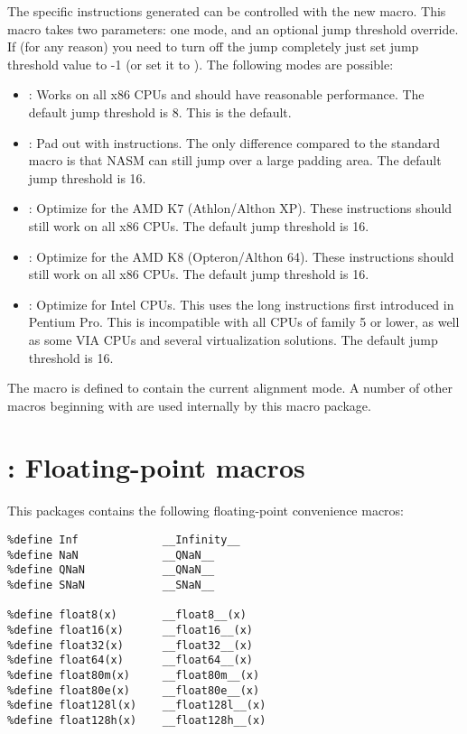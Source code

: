 The specific instructions generated can be controlled with the
new  macro. This macro takes two parameters: one mode,
and an optional jump threshold override. If (for any reason) you need
to turn off the jump completely just set jump threshold value to -1
(or set it to ). The following modes are possible:

\begin{itemize}
    \item{: Works on all x86 CPUs and should have
    reasonable performance. The default jump threshold is 8.
    This is the default.}

    \item{: Pad out with  instructions. The only
    difference compared to the standard  macro is that NASM
    can still jump over a large padding area. The default jump
    threshold is 16.}

    \item{: Optimize for the AMD K7 (Athlon/Althon XP).
    These instructions should still work on all x86 CPUs. The default
    jump threshold is 16.}

    \item{: Optimize for the AMD K8 (Opteron/Althon 64).
    These instructions should still work on all x86 CPUs. The default
    jump threshold is 16.}

    \item{: Optimize for Intel CPUs. This uses the long
     instructions first introduced in Pentium Pro. This
    is incompatible with all CPUs of family 5 or lower, as well as
    some VIA CPUs and several virtualization solutions. The default
    jump threshold is 16.}
\end{itemize}

The macro  is defined to contain the
current alignment mode. A number of other macros beginning with
 are used internally by this macro package.

\section{: Floating-point macros}
\label{sec:pkgfp}

This packages contains the following floating-point convenience macros:

\begin{lstlisting}
%define Inf             __Infinity__
%define NaN             __QNaN__
%define QNaN            __QNaN__
%define SNaN            __SNaN__

%define float8(x)       __float8__(x)
%define float16(x)      __float16__(x)
%define float32(x)      __float32__(x)
%define float64(x)      __float64__(x)
%define float80m(x)     __float80m__(x)
%define float80e(x)     __float80e__(x)
%define float128l(x)    __float128l__(x)
%define float128h(x)    __float128h__(x)
\end{lstlisting}

